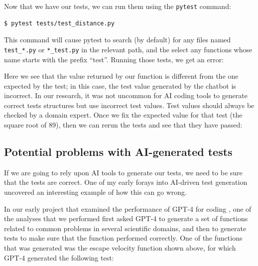 

Now that we have our tests, we can run them using the \texttt{pytest} command:

\begin{lstlisting}[style=shell, numbers=none]
$ pytest tests/test_distance.py
\end{lstlisting}

This command will cause pytest to search (by default) for any files named \texttt{test\_*.py} or \texttt{*\_test.py} in the relevant path, and the select any functions whose name starts with the prefix ``test''.
Running those tests, we get an error:



Here we see that the value returned by our function is different from the one expected by the test; in this case, the test value generated by the chatbot is incorrect.
In our research, it was not uncommon for AI coding tools to generate correct tests structures but use incorrect test values. 
Test values should always be checked by a domain expert.
Once we fix the expected value for that test (the square root of 89), then we can rerun the tests and see that they have passed:



\subsection{Potential problems with AI-generated tests}

If we are going to rely upon AI tools to generate our tests, we need to be sure that the tests are correct.
One of my early forays into AI-driven test generation uncovered an interesting example of how this can go wrong.

In our early project that examined the performance of GPT-4 for coding \citep{Poldrack:2023aa}, one of the analyses that we performed first asked GPT-4 to generate a set of functions related to common problems in several scientific domains, and then to generate tests to make sure that the function performed correctly.
One of the functions that was generated was the escape velocity function shown above, for which GPT-4 generated the following test:



